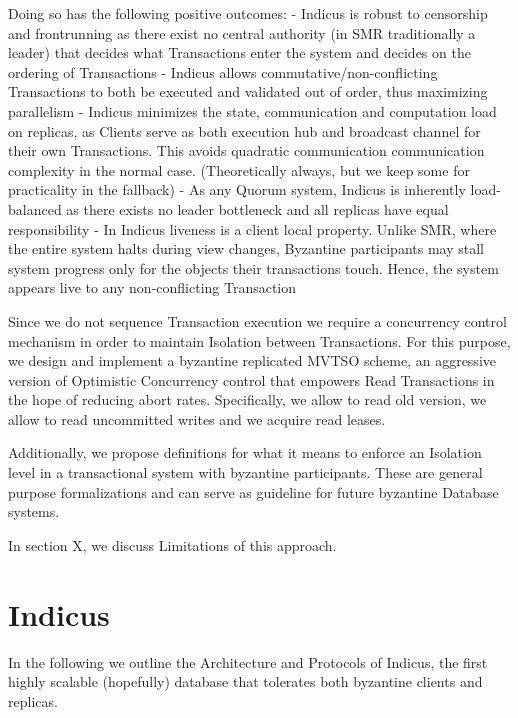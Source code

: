 Doing so has the following positive outcomes:
- Indicus is robust to censorship and frontrunning as there exist no central authority (in SMR traditionally a leader) that decides what Transactions enter the system and decides on the ordering of Transactions
- Indicus allows commutative/non-conflicting Transactions to both be executed and validated out of order, thus maximizing parallelism
- Indicus minimizes the state, communication and computation load on replicas, as Clients serve as both execution hub and broadcast channel for their own Transactions. This avoids quadratic communication communication complexity in the normal case. (Theoretically always, but we keep some for practicality in the fallback)
- As any Quorum system, Indicus is inherently load-balanced as there exists no leader bottleneck and all replicas have equal responsibility
- In Indicus liveness is a client local property. Unlike SMR, where the entire system halts during view changes, Byzantine participants may stall system progress only for the objects their transactions touch. Hence, the system appears live to any non-conflicting Transaction

Since we do not sequence Transaction execution we require a concurrency control mechanism in order to maintain Isolation between Transactions.
For this purpose, we design and implement a byzantine replicated MVTSO scheme, an aggressive version of Optimistic Concurrency control that empowers Read Transactions in the hope of reducing abort rates. Specifically, we allow to read old version, we allow to read uncommitted writes and we acquire read leases.

Additionally, we propose definitions for what it means to enforce an Isolation level in a transactional system with byzantine participants. These are general purpose formalizations and can serve as guideline for future byzantine Database systems.

In section X, we discuss Limitations of this approach. 



\section{Indicus}
In the following we outline the Architecture and Protocols of Indicus, the first highly scalable (hopefully) database that tolerates both byzantine clients and replicas.
